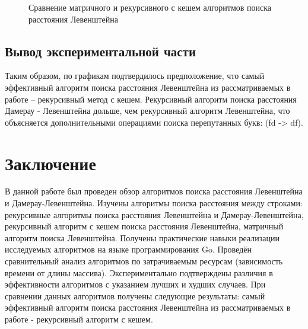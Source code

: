 \begin{figure}[H]
    \caption{Сравнение матричного и рекурсивного с кешем алгоритмов поиска расстояния Левенштейна}
    \label{ris:graph2}
\end{figure}


\section{Вывод экспериментальной части}\label{experimentresult}

Таким образом, по графикам подтвердилось предположение, что самый эффективный алгоритм поиска расстояния Левенштейна
из рассматриваемых в работе – рекурсивный метод с кешем. Рекурсивный алгоритм поиска расстояния Дамерау - Левенштейна дольше, чем 
рекурсивный алгоритм Левенштейна, что объясняется дополнительными операциями поиска перепутанных букв: (fd -> df).




\chapter{Заключение}\label{exit}

В данной работе был проведен обзор алгоритмов поиска расстояния Левенштейна и Дамерау-Левенштейна. 
Изучены алгоритмы поиска расстояния между строками: рекурсивные алгоритмы поиска расстояния Левенштейна 
и Дамерау-Левенштейна, рекурсивный алгоритм с кешем поиска расстояния Левенштейна, матричный алгоритм поиска Левенштейна. 
Получены практические навыки реализации исследуемых алгоритмов на языке программирования Go. 
Проведён сравнительный анализ алгоритмов по затрачиваемым ресурсам (зависимость времени от длины массива). 
Экспериментально подтверждены различия в эффективности алгоритмов с указанием лучших и худших случаев. 
При сравнении данных алгоритмов получены следующие результаты: самый эффективный алгоритм поиска расстояния Левенштейна 
из рассматриваемых в работе - рекурсивный алгоритм с кешем.


